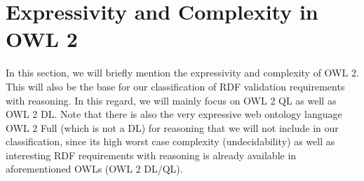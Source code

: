 \documentclass{llncs}
\newcommand{\tb}[1]{\todo[size=\small, color=green!40]{\textbf{Thomas:} #1}}
\newcommand{\er}[1]{\todo[size=\small, color=red!40]{\textbf{Erman:} #1}}
\begin{document}

\section{Expressivity and Complexity in OWL 2}
\label{Expressivity-Complexity-OWL2}

In this section, we will briefly mention the expressivity and complexity of OWL 2. This will also be the base for our classification of RDF validation requirements with reasoning. In this regard, we will  mainly focus on  OWL 2 QL as well as OWL 2 DL. Note that there is also the very expressive web ontology language OWL 2 Full (which is not a DL) for reasoning that we will not include in our classification, since its high worst case complexity (undecidability) as well as interesting RDF requirements with reasoning is already available in aforementioned OWLs (OWL 2 DL/QL).
\end{document}
